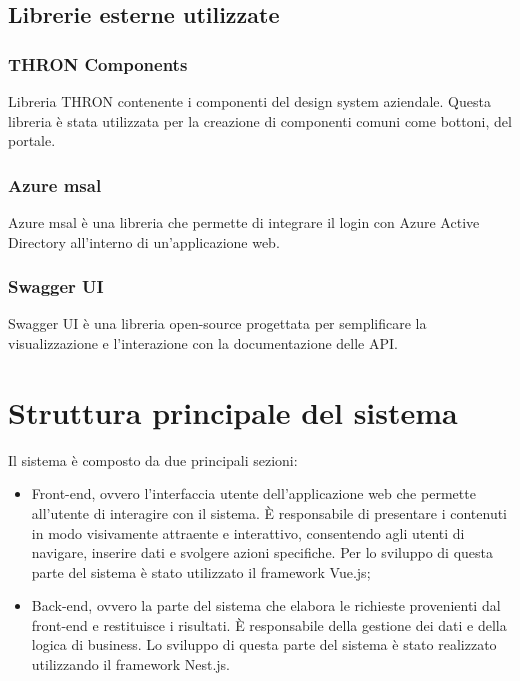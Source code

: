 \subsection{Librerie esterne utilizzate}\label{subsec:librerie-esterne}
\subsubsection{THRON Components}\label{subsubsec:thron-components}
Libreria THRON contenente i componenti del design system aziendale. Questa libreria è stata utilizzata per la creazione di componenti comuni come bottoni, del portale.
\subsubsection{Azure msal}\label{subsubsec:azure-msal}
Azure msal è una libreria che permette di integrare il login con Azure Active Directory all'interno di un'applicazione web.
\subsubsection{Swagger UI}\label{subsubsec:swagger-ui}
Swagger UI è una libreria open-source progettata per semplificare la visualizzazione e l'interazione con la documentazione delle API.

\section{Struttura principale del sistema}
Il sistema è composto da due principali sezioni:
\begin{itemize}
  \item Front-end, ovvero l'interfaccia utente dell'applicazione web che permette all'utente di interagire con il sistema. È responsabile di presentare i contenuti in modo visivamente attraente e interattivo, consentendo agli utenti di navigare, inserire dati e svolgere azioni specifiche. Per lo
  sviluppo di questa parte del sistema è stato utilizzato il framework Vue.js;
  \item Back-end, ovvero la parte del sistema che elabora le richieste provenienti dal front-end e restituisce i risultati. È responsabile della gestione dei dati e della logica di business.
  Lo sviluppo di questa parte del sistema è stato realizzato utilizzando il framework Nest.js. 
\end{itemize}

